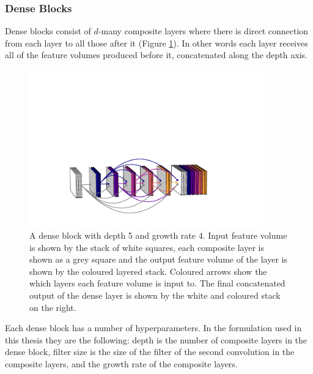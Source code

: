 \subsubsection{Dense Blocks}
Dense blocks consist of $d$-many composite layers where there is direct connection from each layer to all those after it (Figure \ref{fig:machine_learning:dense_block}). 
In other words each layer receives all of the feature volumes produced before it, concatenated along the depth axis. 
\begin{figure}[h!]
    \includegraphics[width=0.90\textwidth]{figures/machine_learning/dense_block.pdf}
    \caption{A dense block with depth 5 and growth rate 4. Input feature volume is shown by the stack of white squares, each composite layer is shown as a grey square and the output feature volume of the layer is shown by the coloured layered stack. Coloured arrows show the which layers each feature volume is input to. The final concatenated output of the dense layer is shown by the white and coloured stack on the right.}
        \label{fig:machine_learning:dense_block}
\end{figure}
Each dense block has a number of hyperparameters. In the formulation used in this thesis they are the following: depth is the number of composite layers in the dense block, filter size is the size of the filter of the second convolution in the composite layers, and the growth rate of the composite layers.


